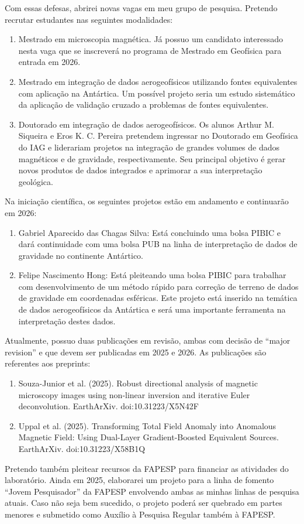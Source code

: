 \documentclass[12pt,a4paper,oneside]{book}
\begin{document}
Com essas defesas, abrirei novas vagas em meu grupo de pesquisa. Pretendo
recrutar estudantes nas seguintes modalidades:

\begin{enumerate}
\item Mestrado em microscopia magnética. Já possuo um candidato interessado nesta
   vaga que se inscreverá no programa de Mestrado em Geofísica para entrada em
   2026.
\item Mestrado em integração de dados aerogeofísicos utilizando fontes
   equivalentes com aplicação na Antártica. Um possível projeto seria
   um estudo sistemático da aplicação de validação cruzado a problemas de
   fontes equivalentes.
\item Doutorado em integração de dados aerogeofísicos. Os alunos Arthur M.
   Siqueira e Eros K. C. Pereira pretendem ingressar no Doutorado em Geofísica
   do IAG e liderariam projetos na integração de grandes volumes de dados
   magnéticos e de gravidade, respectivamente. Seu principal objetivo é gerar
   novos produtos de dados integrados e aprimorar a sua interpretação
   geológica.
\end{enumerate}

Na iniciação científica, os seguintes projetos estão em andamento e continuarão
em 2026:

\begin{enumerate}
\item Gabriel Aparecido das Chagas Silva: Está concluindo uma bolsa PIBIC e dará
   continuidade com uma bolsa PUB na linha de interpretação de dados de
   gravidade no continente Antártico.
\item Felipe Nascimento Hong: Está pleiteando uma bolsa PIBIC para trabalhar com
   desenvolvimento de um método rápido para correção de terreno de dados de
   gravidade em coordenadas esféricas. Este projeto está inserido na temática
   de dados aerogeofísicos da Antártica e será uma importante ferramenta na
   interpretação destes dados.
\end{enumerate}

Atualmente, possuo duas publicações em revisão, ambas com decisão de ``major
revision'' e que devem ser publicadas em 2025 e 2026. As publicações são
referentes aos preprints:

\begin{enumerate}
\item Souza-Junior et al. (2025). Robust directional analysis of magnetic microscopy images using non-linear inversion and iterative Euler deconvolution. EarthArXiv. doi:10.31223/X5N42F
\item Uppal et al. (2025). Transforming Total Field Anomaly into Anomalous Magnetic Field: Using Dual-Layer Gradient-Boosted Equivalent Sources. EarthArXiv. doi:10.31223/X58B1Q
\end{enumerate}

Pretendo também pleitear recursos da FAPESP para financiar as atividades do
laboratório. Ainda em 2025, elaborarei um projeto para a linha de fomento
``Jovem Pesquisador'' da FAPESP envolvendo ambas as minhas linhas de pesquisa
atuais. Caso não seja bem sucedido, o projeto poderá ser quebrado em partes
menores e submetido como Auxílio à Pesquisa Regular também à FAPESP.
\end{document}

